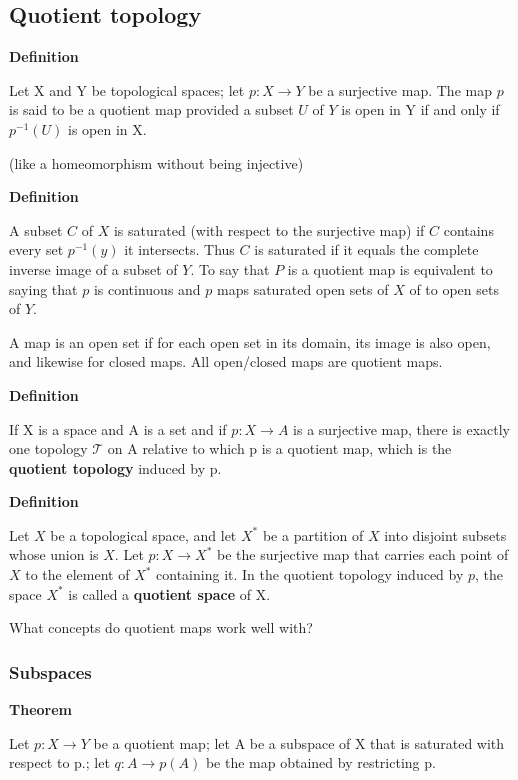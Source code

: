 \documentclass[11pt]{article}
\begin{document}
\subsection{Quotient topology}
\label{sec:orga386c8b}

\textbf{Definition}

Let X and Y be topological spaces; let \(p : X \to Y\) be a surjective map. The map \(p\) is said to be a quotient map provided a subset \(U\) of \(Y\) is open in Y if and only if \(p^{-1}(U)\) is open in X.

(like a homeomorphism without being injective)


\textbf{Definition}

A subset \(C\) of \(X\) is saturated (with respect to the surjective map) if \(C\) contains every set \(p^{-1}({y})\) it intersects. Thus \(C\) is saturated if it equals the complete inverse image of a subset of \(Y\). To say that \(P\) is a quotient map is equivalent to saying that \(p\) is continuous and \(p\) maps saturated open sets of \(X\) of to open sets of \(Y\).

A map is an open set if for each open set in its domain, its image is also open, and likewise for closed maps. All open/closed maps are quotient maps.

\textbf{Definition}

If X is a space and A is a set and if \(p:X\to A\) is a surjective map, there is exactly one topology \(\mathcal{T}\) on A relative to which p is a quotient map, which is the \textbf{quotient topology} induced by p.

\textbf{Definition}

Let \(X\) be a topological space, and let \(X^*\) be a partition of \(X\) into disjoint subsets whose union is \(X\). Let \(p : X \to X^*\) be the surjective map that carries each point of \(X\) to the element of \(X^*\) containing it. In the quotient topology induced by \(p\), the space \(X^*\) is called a \textbf{quotient space} of X.

What concepts do quotient maps work well with?

\subsubsection{Subspaces}
\label{sec:org3ac9669}

\textbf{Theorem}

Let \(p : X \to Y\) be a quotient map; let A be a subspace of X that is saturated with respect to p.; let \(q: A \to p(A)\) be the map obtained by restricting p.
\end{document}
